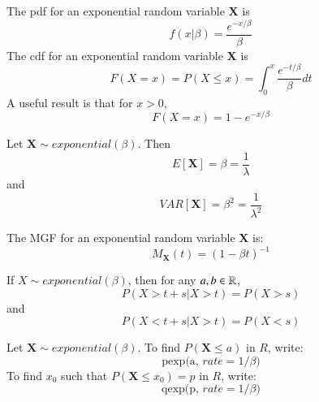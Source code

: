 \documentclass[12pt]{report}
\begin{document}
\begin{defn}{}{}
    The pdf for an exponential random variable $\mathbf{X}$ is \begin{equation*}
        f(x\vert\beta) = \frac{e^{-x/\beta}}{\beta}
    \end{equation*}
    The cdf for an exponential random variable $\mathbf{X}$ is \begin{equation*}
        F(X = x) = P(X\leq x) = \int_{0}^x\frac{e^{-t/\beta}}{\beta}dt
    \end{equation*}
    A useful result is that for $x > 0$, \begin{equation*}
        F(X = x) = 1 - e^{-x/\beta}
    \end{equation*}
\end{defn}



\begin{defn}{}{}
    Let $\mathbf{X}\sim exponential(\beta)$. Then \begin{equation*}
        E[\mathbf{X}] = \beta = \frac{1}{\lambda}
    \end{equation*}
    and
    \begin{equation*}
        VAR[\mathbf{X}] = \beta^2 = \frac{1}{\lambda^2}
    \end{equation*}
\end{defn}


\begin{defn}{}{}
    The MGF for an exponential random variable $\mathbf{X}$ is: \begin{equation*}
        M_{\mathbf{X}}(t) = (1-\beta t)^{-1}
    \end{equation*}
\end{defn}

\begin{props}{}{}
    If $X \sim exponential(\beta)$, then for any $a,b \in \mathbb R$, \begin{equation*}
        P(X > t+s\vert X >t) = P(X > s)
    \end{equation*}
    and \begin{equation*}
        P(X < t+s\vert X > t) = P(X < s)
    \end{equation*}
\end{props}


\begin{defn}{}{}
    Let $\mathbf{X}\sim exponential(\beta)$. To find $P(\mathbf{X} \leq a)$ in $R$, write: \begin{equation*}
        \text{pexp(a, $rate = 1/\beta$)} 
    \end{equation*}
    To find $x_0$ such that $P(\mathbf{X} \leq x_0) = p$ in $R$, write: \begin{equation*}
        \text{qexp(p, $rate = 1/\beta$)}
    \end{equation*}
\end{defn}
\end{document}
